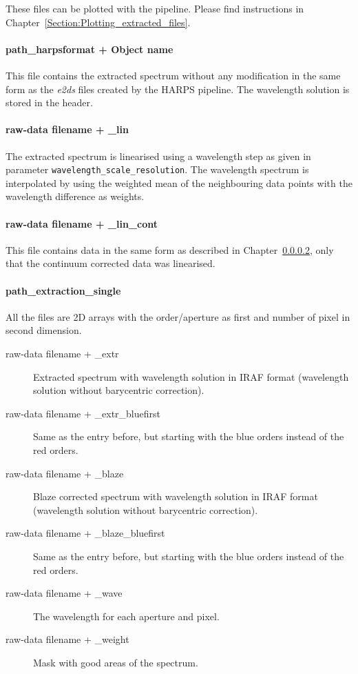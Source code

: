 \documentclass[10pt,a4paper]{article}
\begin{document}
These files can be plotted with the pipeline. Please find instructions in Chapter~\ref{Section:Plotting_extracted_files}.

\paragraph{path\_harpsformat + Object name}
This file contains the extracted spectrum without any modification in the same form as the \textit{e2ds} files created by the HARPS pipeline. The wavelength solution is stored in the header.

\paragraph{raw-data filename + \_lin}
\label{Section:linearised_spectrum}
The extracted spectrum is linearised using a wavelength step as given in parameter \verb|wavelength_scale_resolution|. The wavelength spectrum is interpolated by using the weighted mean of the neighbouring data points with the wavelength difference as weights.

\paragraph{raw-data filename + \_lin\_cont}
This file contains data in the same form as described in Chapter~\ref{Section:linearised_spectrum}, only that the continuum corrected data was linearised.

\paragraph{path\_extraction\_single}
All the files are 2D arrays with the order/aperture as first and number of pixel in second dimension.
\begin{description}
 \item[raw-data filename + \_extr] Extracted spectrum with wavelength solution in IRAF format (wavelength solution without barycentric correction).
 \item[raw-data filename + \_extr\_bluefirst] Same as the entry before, but starting with the blue orders instead of the red orders.
 \item[raw-data filename + \_blaze] Blaze corrected spectrum with wavelength solution in IRAF format (wavelength solution without barycentric correction).
 \item[raw-data filename + \_blaze\_bluefirst] Same as the entry before, but starting with the blue orders instead of the red orders.
 \item[raw-data filename + \_wave] The wavelength for each aperture and pixel.
 \item[raw-data filename + \_weight] Mask with good areas of the spectrum.
\end{description}
\end{document}
